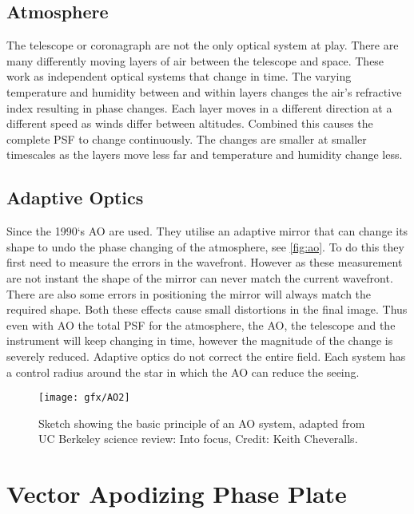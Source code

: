 \subsection{Atmosphere}

The telescope or coronagraph are not the only optical system at play. There are many differently moving layers of air between the telescope and space. These work as independent optical systems that change in time. The varying temperature and humidity between and within layers changes the air's refractive index resulting in phase changes. Each layer moves in a different direction at a different speed as winds differ between altitudes. Combined this causes the complete \ac{PSF} to change continuously. The changes are smaller at smaller timescales as the layers move less far and temperature and humidity change less. 

\subsection{Adaptive Optics}
\label{sec:ao}
Since the 1990‘s \ac{AO} are used. They utilise an adaptive mirror that can change its shape to undo the phase changing of the atmosphere, see \autoref{fig:ao}. To do this they first need to measure the errors in the wavefront. However as these measurement are not instant the shape of the mirror can never match the current wavefront. There are also some errors in positioning the mirror will always match the required shape. Both these effects cause small distortions in the final image. Thus even with \ac{AO} the total \ac{PSF} for the atmosphere, the \ac{AO}, the telescope and the instrument will keep changing in time, however the magnitude of the change is severely reduced. Adaptive optics do not correct the entire field. Each system has a control radius around the star in which the \ac{AO} can reduce the seeing.

\begin{figure}[H]
    \caption{Sketch showing the basic principle of an \ac{AO} system, adapted from UC Berkeley science review: Into focus, Credit: Keith Cheveralls.}
    \centering
    \texttt{[image: gfx/AO2]}
    \label{fig:ao}
\end{figure}





\section{Vector Apodizing Phase Plate}
\label{sec:vapp}


